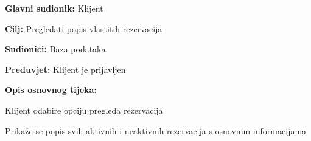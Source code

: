 \noindent {}
\begin{packed_item}
	
	\item \textbf{Glavni sudionik: } Klijent
	\item \textbf{Cilj:} Pregledati popis vlastitih rezervacija
	\item \textbf{Sudionici:} Baza podataka
	\item \textbf{Preduvjet:} Klijent je prijavljen
	\item \textbf{Opis osnovnog tijeka:}
	
	\item[] \begin{packed_enum}
		
		\item Klijent odabire opciju pregleda rezervacija
		\item Prikaže se popis svih aktivnih i neaktivnih rezervacija s osnovnim informacijama

	\end{packed_enum}
\end{packed_item}

\pagebreak

